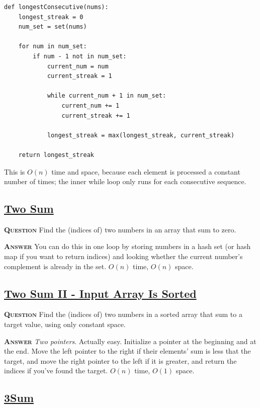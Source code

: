 \documentclass[table, xcdraw]{article}%
\begin{document}
\begin{verbatim}
def longestConsecutive(nums):
    longest_streak = 0
    num_set = set(nums)

    for num in num_set:
        if num - 1 not in num_set:
            current_num = num
            current_streak = 1

            while current_num + 1 in num_set:
                current_num += 1
                current_streak += 1

            longest_streak = max(longest_streak, current_streak)

    return longest_streak
\end{verbatim}

This is $O(n)$ time and space, because each element is processed a constant number of times; the inner while loop only runs for each consecutive sequence.

\subsection{\href{https://leetcode.com/problems/two-sum}{Two Sum}}

\textsc{\textbf{Question}} Find the (indices of) two numbers in an array that sum to zero.

\textsc{\textbf{Answer}} You can do this in one loop by storing numbers in a hash set (or hash map if you want to return indices) and looking whether the current number's complement is already in the set. $O(n)$ time, $O(n)$ space.

\subsection{\href{https://leetcode.com/problems/two-sum}{Two Sum II - Input Array Is Sorted}}

\textsc{\textbf{Question}} Find the (indices of) two numbers in a sorted array that sum to a target value, using only constant space.

\textsc{\textbf{Answer}} \textit{Two pointers}. Actually easy. Initialize a pointer at the beginning and at the end. Move the left pointer to the right if their elements' sum is less that the target, and move the right pointer to the left if it is greater, and return the indices if you've found the target. $O(n)$ time, $O(1)$ space.

\subsection{\href{https://leetcode.com/problems/3sum}{3Sum}}
\end{document}
